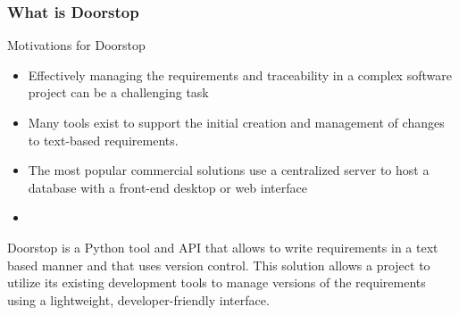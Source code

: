 \documentclass[aspectratio=169]{beamer}
\begin{document}
\begin{frame}
  \frametitle{What is Doorstop}
  \begin{block}{Motivations for Doorstop}
  \begin{itemize}
    \item Effectively managing the requirements and traceability in a complex software project can be a
challenging task
    \item Many tools exist to support the initial creation and management of changes to
text-based requirements.
    \item The most popular commercial solutions use a centralized server to host
a database with a front-end desktop or web interface
    \item {\bf }
  \end{itemize}
  
  \end{block}

  Doorstop is a Python tool and API that allows to write requirements in a text based manner and that uses version control. This solution allows a project to utilize its existing development tools to manage versions of the requirements using a lightweight, developer-friendly interface.  
\end{frame}
\end{document}
